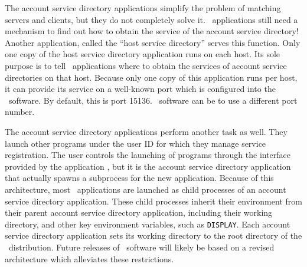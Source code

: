The account service directory applications simplify the problem
of matching servers and clients, but they do not completely solve
it.  \OOMMF\ applications still need a mechanism to find out how
to obtain the service of the account service directory!
Another application, called the ``host service directory'' serves
this function.  Only one copy of the host service directory application
runs on each host.  Its sole purpose is to tell \OOMMF\ applications
where to obtain the services of account service directories on that
host.  Because only one copy of this application runs per host,
it can provide its service on a well-known port which is
configured into the \OOMMF\ software.  By default, this is port 15136.
\OOMMF\ software can be 
to use a different port number.

The account service directory applications perform another task
as well.  They launch other programs under the user ID for which
they manage service registration.  The user controls the launching
of programs through the interface provided by the application
, but it is the account service directory
application that actually spawns a subprocess for the new application.
Because of this architecture, most \OOMMF\ applications are launched
as child processes of an account service directory application.  These
child processes inherit their 
environment
from their parent account
service directory application, including their working directory, and
other key environment 
variables, 
such as {\tt DISPLAY}. 
Each account
service directory application sets its 
working directory
to the root
directory of the \OOMMF\ distribution.  Future releases of \OOMMF\
software will likely be based on a revised architecture which
alleviates these restrictions.

